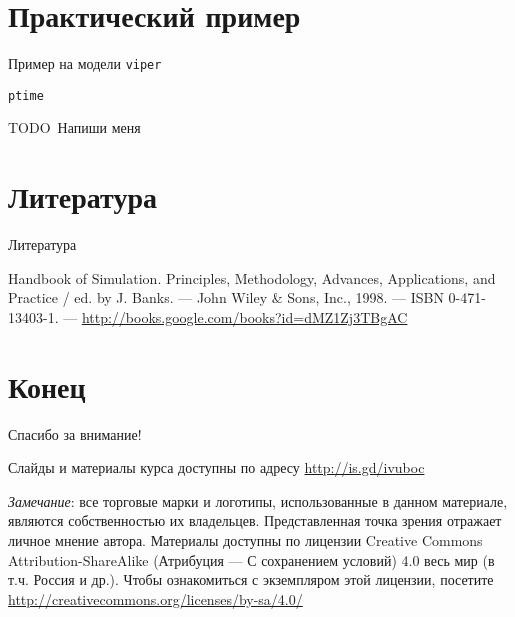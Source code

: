 \documentclass{beamer}
\newcommand{\todo}[1][Напиши меня]{{\color{red}TODO\ #1}}
\begin{document}
\begin{frame}{}


\end{frame}



\section{Практический пример}

\begin{frame}[fragile]{Пример на модели \texttt{viper}}
\begin{verbatim}
ptime
\end{verbatim}
\todo
    
\end{frame}


\section{Литература}

\begin{frame}[allowframebreaks]{Литература}
\begin{thebibliography}{99}
     Handbook of Simulation. Principles, Methodology, Advances, Applications, and Practice / ed. by J. Banks. — John Wiley \& Sons, Inc., 1998. — ISBN 0-471-13403-1. — \url{http://books.google.com/books?id=dMZ1Zj3TBgAC} %
\end{thebibliography}
\end{frame}


\section{Конец}
\begin{frame}

{\huge{Спасибо за внимание!}\par}

\vfill

Слайды и материалы курса доступны по адресу \url{http://is.gd/ivuboc} %

\vfill

\tiny{\textit{Замечание}: все торговые марки и логотипы, использованные в данном материале, являются собственностью их владельцев. Представленная точка зрения отражает личное мнение автора.
Материалы доступны по лицензии Creative Commons Attribution-ShareAlike (Атрибуция — С сохранением условий) 4.0 весь мир (в т.ч. Россия и др.). Чтобы ознакомиться с экземпляром этой лицензии, посетите \url{http://creativecommons.org/licenses/by-sa/4.0/}
}

\end{frame}
\end{document}
